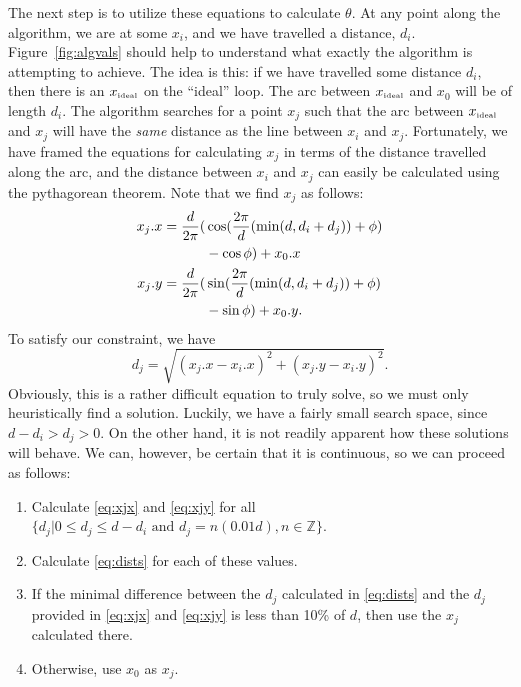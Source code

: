\documentclass[twocolumn,11pt]{article}
\begin{document}
The next step is to utilize these equations to calculate $\theta$. At any point
along the algorithm, we are at some $x_i$, and we have travelled a distance,
$d_i$. Figure~\ref{fig:algvals} should help to understand what exactly the
algorithm is attempting to achieve. The idea is this: if we have travelled some
distance $d_i$, then there is an $x_{\mbox{{\tiny ideal}}}$ on the ``ideal''
loop. The arc between $x_{\mbox{{\tiny ideal}}}$ and $x_0$ will be of length
$d_i$. The algorithm searches for a point $x_j$ such that the arc between
$x_{\mbox{{\tiny ideal}}}$ and $x_j$ will have the \emph{same} distance as the
line between $x_i$ and $x_j$. Fortunately, we have framed the equations for
calculating $x_j$ in terms of the distance travelled along the arc, and the
distance between $x_i$ and $x_j$ can easily be calculated using the pythagorean
theorem. Note that we find $x_j$ as follows:
\begin{align}
  x_j.x = \frac{d}{2\pi} ( & \cos( \frac{ 2 \pi }{ d } ( \min( d, d_i + d_j ) )
                                  + \phi ) \notag \\ & - \cos \phi ) + x_0.x
                                  \label{eq:xjx} \\
  x_j.y = \frac{d}{2\pi} ( & \sin( \frac{ 2 \pi }{ d } ( \min( d, d_i + d_j ) )
                                  + \phi ) \notag \\ & - \sin \phi ) + x_0.y.
                                  \label{eq:xjy}
\end{align}
To satisfy our constraint, we have
\begin{equation}
  d_j = \sqrt{ ( x_j.x - x_i.x )^2 + ( x_j.y - x_i.y )^2 }. \label{eq:dists}
\end{equation}
Obviously, this is a rather difficult equation to truly solve, so we must only
heuristically find a solution. Luckily, we
have a fairly small search space, since $d - d_i > d_j > 0$. On the other hand,
it is not readily apparent how these solutions will behave. We can, however,
be certain that it is continuous, so we can proceed as follows:
\begin{enumerate}
\item Calculate \eqref{eq:xjx} and \eqref{eq:xjy} for all $\{ d_j |
  0 \leq d_j \leq d - d_i \mbox{ and } d_j = n(0.01d), n \in \mathbb{Z} \}$.
\item Calculate \eqref{eq:dists} for each of these values.
\item If the minimal difference between the $d_j$ calculated in \eqref{eq:dists}
  and the $d_j$ provided in \eqref{eq:xjx} and \eqref{eq:xjy} is less than
  10\% of $d$, then use the $x_j$ calculated there.
\item Otherwise, use $x_0$ as $x_j$.
\end{enumerate}
\end{document}
